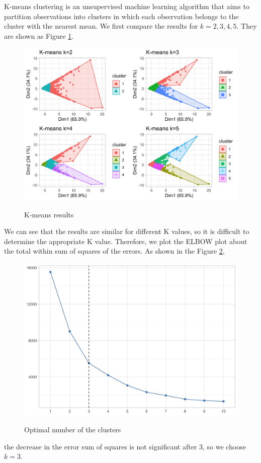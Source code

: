 \documentclass[12pt]{article}
\begin{document}
K-means clustering is an unsupervised machine learning algorithm that aims to partition observations into clusters in which each observation belongs to the cluster with the nearest mean. We first compare the results for $k= 2, 3, 4, 5$. They are shown as Figure \ref{fig:cluster_result}. 
\begin{figure}[ht]
    \centering
    \caption{K-means results}
    \includegraphics[width=.75\textwidth]{k-means results-1.png}
    \label{fig:cluster_result}
\end{figure}
We can see that the results are similar for different K values, so it is difficult to determine the appropriate K value. Therefore, we plot the ELBOW plot about the total within sum of squares of the errors. As shown in the Figure \ref{fig:elbow},
\begin{figure}[ht]
    \centering
    \caption{Optimal number of the clusters}
    \includegraphics[width=.75\textwidth]{elbow-1.png}
    \label{fig:elbow}
\end{figure}
the decrease in the error sum of squares is not significant after $3$, so we choose $k=3$. 
\end{document}
